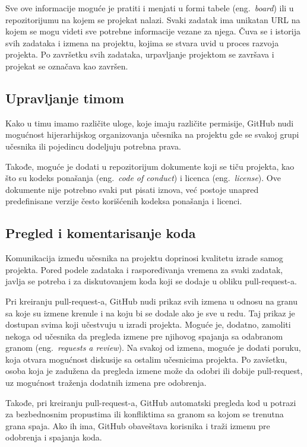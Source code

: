 \documentclass[12pt]{report}
\begin{document}
Sve ove informacije moguće je pratiti i menjati u formi tabele (eng.\ \textit{board}) ili u repozitorijumu na kojem se projekat nalazi. Svaki zadatak ima unikatan URL na kojem se mogu videti sve potrebne informacije vezane za njega. Čuva se i istorija svih zadataka i izmena na projektu, kojima se stvara uvid u proces razvoja projekta. Po završetku svih zadataka, urpavljanje projektom se završava i projekat se označava kao završen.

\subsection{Upravljanje timom}
Kako u timu imamo različite uloge, koje imaju različite permisije, GitHub nudi mogućnost hijerarhijskog organizovanja učesnika na projektu gde se svakoj grupi učesnika ili pojedincu dodeljuju potrebna prava.

Takođe, moguće je dodati u repozitorijum dokumente koji se tiču projekta, kao što su kodeks ponašanja (eng.\ \textit{code of conduct}) i licenca (eng.\ \textit{license}). Ove dokumente nije potrebno svaki put pisati iznova, već postoje unapred predefinisane verzije često korišćenih kodeksa ponašanja i licenci.

\subsection{Pregled i komentarisanje koda}
Komunikacija između učesnika na projektu doprinosi kvalitetu izrade samog projekta. Pored podele zadataka i raspoređivanja vremena za svaki zadatak, javlja se potreba i za diskutovanjem koda koji se dodaje u obliku pull-request-a.

Pri kreiranju pull-request-a, GitHub nudi prikaz svih izmena u odnosu na granu sa koje su izmene krenule i na koju bi se dodale ako je sve u redu. Taj prikaz je dostupan svima koji učestvuju u izradi projekta. Moguće je, dodatno, zamoliti nekoga od učesnika da pregleda izmene pre njihovog spajanja sa odabranom granom (eng.\ \textit{requests a review}). Na svakoj od izmena, moguće je dodati poruku, koja otvara mogućnost diskusije sa ostalim učesnicima projekta. Po zavšetku, osoba koja je zadužena da pregleda izmene može da odobri ili dobije pull-request, uz mogućnost traženja dodatnih izmena pre odobrenja.

Takođe, pri kreiranju pull-request-a, GitHub automatski pregleda kod u potrazi za bezbednosnim propustima ili konfliktima sa granom sa kojom se trenutna grana spaja. Ako ih ima, GitHub obaveštava korisnika i traži izmenu pre odobrenja i spajanja koda.
\end{document}
